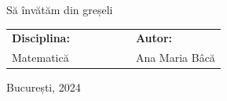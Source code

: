 \documentclass{article}
\theoremstyle{definition}
\numberwithin{definition}{section}
\theoremstyle{theorem}
\numberwithin{theorem}{section}
\theoremstyle{prop}
\numberwithin{prop}{section}
\theoremstyle{lema}
\numberwithin{lema}{section}
\theoremstyle{corollary}
\numberwithin{corollary}{section}
\theoremstyle{axiom}
\numberwithin{axiom}{section}
\theoremstyle{conjecture}
\numberwithin{conjecture}{section}
\theoremstyle{plain}
\theoremstyle{remark}
\numberwithin{equation}{section}
\begin{document}
\begin{titlepage}
	\begin{center}
		

		\par\vspace*{35mm}
		{\Huge Să învătăm din greșeli}
		\par\vspace*{35mm}
		\begin{table}[h]
        	\begin{center}
				\begin{tabular}{lcccccl}
					\Large \textbf{\Large Disciplina:}
					\vspace*{1mm} &&&&&& \Large \textbf{\Large Autor:}\vspace*{1mm} \\
					\Large Matematică &&&&&& \Large Ana Maria Bâcă
				\end{tabular}
			\end{center}
		\end{table}

		\par\vspace*{40mm}
		\Large București, 2024
	\end{center}
\end{titlepage}

\tableofcontents
\newpage
\end{document}
